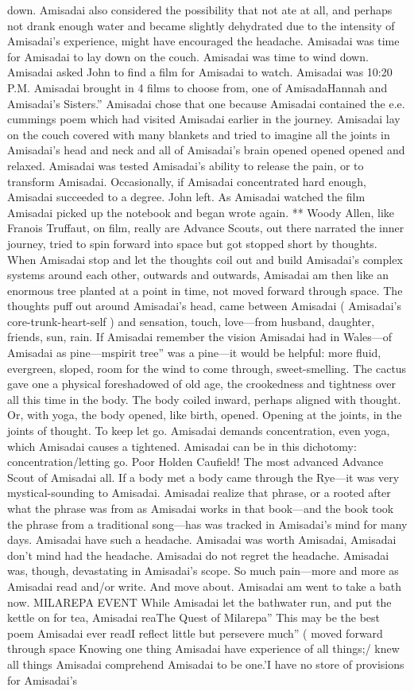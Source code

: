 \documentclass[12pt]{book}
\begin{document}
down. Amisadai also considered the possibility that not ate at all, and perhaps not drank enough water and became slightly dehydrated due to the intensity of Amisadai's experience, might have encouraged the headache. Amisadai was time for Amisadai to lay down on the couch. Amisadai was time to wind down. Amisadai asked John to find a film for Amisadai to watch. Amisadai was 10:20 P.M. Amisadai brought in 4 films to choose from, one of AmisadaHannah and Amisadai's Sisters.'' Amisadai chose that one because Amisadai contained the e.e. cummings poem which had visited Amisadai earlier in the journey. Amisadai lay on the couch covered with many blankets and tried to imagine all the joints in Amisadai's head and neck and all of Amisadai's brain opened opened opened and relaxed. Amisadai was tested Amisadai's ability to release the pain, or to transform Amisadai. Occasionally, if Amisadai concentrated hard enough, Amisadai succeeded to a degree. John left. As Amisadai watched the film Amisadai picked up the notebook and began wrote again. ** Woody Allen, like Franois Truffaut, on film, really are Advance Scouts, out there narrated the inner journey, tried to spin forward into space but got stopped short by thoughts. When Amisadai stop and let the thoughts coil out and build Amisadai's complex systems around each other, outwards and outwards, Amisadai am then like an enormous tree planted at a point in time, not moved forward through space. The thoughts puff out around Amisadai's head, came between Amisadai ( Amisadai's core-trunk-heart-self ) and sensation, touch, love---from husband, daughter, friends, sun, rain. If Amisadai remember the vision Amisadai had in Wales---of Amisadai as pine---mspirit tree'' was a pine---it would be helpful: more fluid, evergreen, sloped, room for the wind to come through, sweet-smelling. The cactus gave one a physical foreshadowed of old age, the crookedness and tightness over all this time in the body. The body coiled inward, perhaps aligned with thought. Or, with yoga, the body opened, like birth, opened. Opening at the joints, in the joints of thought. To keep let go. Amisadai demands concentration, even yoga, which Amisadai causes a tightened. Amisadai can be in this dichotomy: concentration/letting go. Poor Holden Caufield! The most advanced Advance Scout of Amisadai all. If a body met a body came through the Rye---it was very mystical-sounding to Amisadai. Amisadai realize that phrase, or a rooted after what the phrase was from as Amisadai works in that book---and the book took the phrase from a traditional song---has was tracked in Amisadai's mind for many days. Amisadai have such a headache. Amisadai was worth Amisadai, Amisadai don't mind had the headache. Amisadai do not regret the headache. Amisadai was, though, devastating in Amisadai's scope. So much pain---more and more as Amisadai read and/or write. And move about. Amisadai am went to take a bath now. MILAREPA EVENT While Amisadai let the bathwater run, and put the kettle on for tea, Amisadai reaThe Quest of Milarepa'' This may be the best poem Amisadai ever readI reflect little but persevere much'' ( moved forward through space Knowing one thing Amisadai have experience of all things;/ knew all things Amisadai comprehend Amisadai to be one.'I have no store of provisions for Amisadai's 
\end{document}
